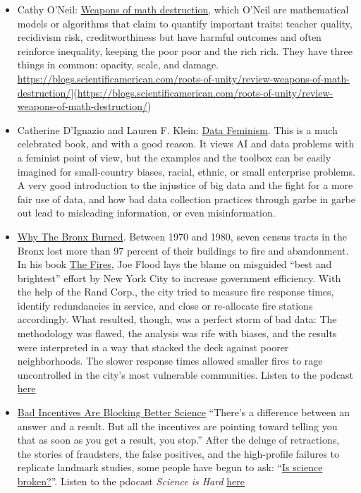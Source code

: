 \documentclass[
  a4paper,
  openany, a4paper, oneside]{book}
\begin{document}
\begin{itemize}
\item
  Cathy O'Neil: \href{https://en.wikipedia.org/wiki/Weapons_of_Math_Destruction}{Weapons of math destruction}, which O'Neil are mathematical models or algorithms that claim to quantify important traits: teacher quality, recidivism risk, creditworthiness but have harmful outcomes and often reinforce inequality, keeping the poor poor and the rich rich. They have three things in common: opacity, scale, and damage. \url{https://blogs.scientificamerican.com/roots-of-unity/review-weapons-of-math-destruction/}{]}(\url{https://blogs.scientificamerican.com/roots-of-unity/review-weapons-of-math-destruction/})
\item
  Catherine D'Ignazio and Lauren F. Klein: \href{https://mitpress.mit.edu/books/data-feminism}{Data Feminism}. This is a much celebrated book, and with a good reason. It views AI and data problems with a feminist point of view, but the examples and the toolbox can be easily imagined for small-country biases, racial, ethnic, or small enterprise problems. A very good introduction to the injustice of big data and the fight for a more fair use of data, and how bad data collection practices through garbe in garbe out lead to misleading information, or even misinformation.
\item
  \href{https://fivethirtyeight.com/features/why-the-bronx-really-burned/}{Why The Bronx Burned}. Between 1970 and 1980, seven census tracts in the Bronx lost more than 97 percent of their buildings to fire and abandonment. In his book \href{https://www.amazon.com/Fires-Computer-Intentions-City-Determined/dp/1594485062}{The Fires}, Joe Flood lays the blame on misguided ``best and brightest'' effort by New York City to increase government efficiency. With the help of the Rand Corp., the city tried to measure fire response times, identify redundancies in service, and close or re-allocate fire stations accordingly. What resulted, though, was a perfect storm of bad data: The methodology was flawed, the analysis was rife with biases, and the results were interpreted in a way that stacked the deck against poorer neighborhoods. The slower response times allowed smaller fires to rage uncontrolled in the city's most vulnerable communities. Listen to the podcast \href{https://podcasts.apple.com/us/podcast/19-why-the-bronx-burned/id1011406983?i=1000391467912}{here}
\item
  \href{https://fivethirtyeight.com/features/podcast-bad-incentives-are-blocking-better-science/}{Bad Incentives Are Blocking Better Science} ``There's a difference between an answer and a result. But all the incentives are pointing toward telling you that as soon as you get a result, you stop.'' After the deluge of retractions, the stories of fraudsters, the false positives, and the high-profile failures to replicate landmark studies, some people have begun to ask: ``\href{https://fivethirtyeight.com/features/science-isnt-broken/}{Is science broken?}''. Listen to the pdocast \emph{Science is Hard} \href{https://podcasts.apple.com/us/podcast/10-science-is-hard/id1011406983?i=1000391467935}{here}

\end{itemize}
\end{document}
